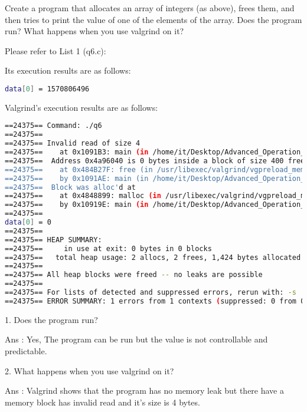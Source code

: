 \documentclass[10pt, answers]{exam}
\begin{document}
\begin{questions} 
    \setcounter{question}{5} 
    
    \question 
    Create a program that allocates an array of integers (as above), frees
    them, and then tries to print the value of one of the elements of
    the array. Does the program run? What happens when you use
    valgrind on it?

    
    \begin{solution}
    Please refer to List 1 (q6.c):
    
    
    
    Its execution results are as follows:
    
    \begin{lstlisting}[language=bash]
data[0] = 1570806496
    \end{lstlisting}
    
    Valgrind's execution results are as follows:
    
    \begin{lstlisting}[language=bash]
==24375== Command: ./q6
==24375==
==24375== Invalid read of size 4
==24375==    at 0x1091B3: main (in /home/it/Desktop/Advanced_Operation_Systen/hw3/q6)
==24375==  Address 0x4a96040 is 0 bytes inside a block of size 400 free'd
==24375==    at 0x484B27F: free (in /usr/libexec/valgrind/vgpreload_memcheck-amd64-linux.so)
==24375==    by 0x1091AE: main (in /home/it/Desktop/Advanced_Operation_Systen/hw3/q6)
==24375==  Block was alloc'd at
==24375==    at 0x4848899: malloc (in /usr/libexec/valgrind/vgpreload_memcheck-amd64-linux.so)
==24375==    by 0x10919E: main (in /home/it/Desktop/Advanced_Operation_Systen/hw3/q6)
==24375==
data[0] = 0
==24375==
==24375== HEAP SUMMARY:
==24375==     in use at exit: 0 bytes in 0 blocks
==24375==   total heap usage: 2 allocs, 2 frees, 1,424 bytes allocated
==24375==
==24375== All heap blocks were freed -- no leaks are possible
==24375==
==24375== For lists of detected and suppressed errors, rerun with: -s
==24375== ERROR SUMMARY: 1 errors from 1 contexts (suppressed: 0 from 0)
    \end{lstlisting}
    
    1. Does the program run?
    
    Ans : Yes, The program can be run but the value is 
    not controllable and predictable.

    2. What happens when you use valgrind on it?

    Ans : Valgrind shows that the program has no memory leak 
    but there have a memory block has invalid read and it's size is 4 bytes.

    \end{solution}
    
    
    
    \end{questions}
\end{document}
